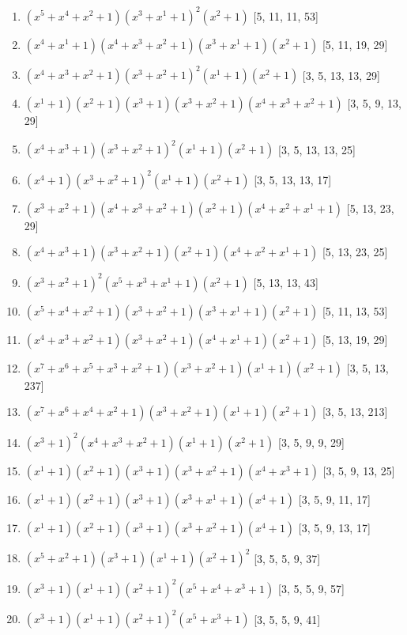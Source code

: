 \documentclass[10pt,twocolumn]{article}
\begin{document}
\begin{enumerate}
\item $(x^{5} + x^{4} + x^{2} + 1)(x^{3} + x^{1} + 1)^{2}(x^{2} + 1)$  [5, 11, 11, 53]
\item $(x^{4} + x^{1} + 1)(x^{4} + x^{3} + x^{2} + 1)(x^{3} + x^{1} + 1)(x^{2} + 1)$  [5, 11, 19, 29]
\item $(x^{4} + x^{3} + x^{2} + 1)(x^{3} + x^{2} + 1)^{2}(x^{1} + 1)(x^{2} + 1)$  [3, 5, 13, 13, 29]
\item $(x^{1} + 1)(x^{2} + 1)(x^{3} + 1)(x^{3} + x^{2} + 1)(x^{4} + x^{3} + x^{2} + 1)$  [3, 5, 9, 13, 29]
\item $(x^{4} + x^{3} + 1)(x^{3} + x^{2} + 1)^{2}(x^{1} + 1)(x^{2} + 1)$  [3, 5, 13, 13, 25]
\item $(x^{4} + 1)(x^{3} + x^{2} + 1)^{2}(x^{1} + 1)(x^{2} + 1)$  [3, 5, 13, 13, 17]
\item $(x^{3} + x^{2} + 1)(x^{4} + x^{3} + x^{2} + 1)(x^{2} + 1)(x^{4} + x^{2} + x^{1} + 1)$  [5, 13, 23, 29]
\item $(x^{4} + x^{3} + 1)(x^{3} + x^{2} + 1)(x^{2} + 1)(x^{4} + x^{2} + x^{1} + 1)$  [5, 13, 23, 25]
\item $(x^{3} + x^{2} + 1)^{2}(x^{5} + x^{3} + x^{1} + 1)(x^{2} + 1)$  [5, 13, 13, 43]
\item $(x^{5} + x^{4} + x^{2} + 1)(x^{3} + x^{2} + 1)(x^{3} + x^{1} + 1)(x^{2} + 1)$  [5, 11, 13, 53]
\item $(x^{4} + x^{3} + x^{2} + 1)(x^{3} + x^{2} + 1)(x^{4} + x^{1} + 1)(x^{2} + 1)$  [5, 13, 19, 29]
\item $(x^{7} + x^{6} + x^{5} + x^{3} + x^{2} + 1)(x^{3} + x^{2} + 1)(x^{1} + 1)(x^{2} + 1)$  [3, 5, 13, 237]
\item $(x^{7} + x^{6} + x^{4} + x^{2} + 1)(x^{3} + x^{2} + 1)(x^{1} + 1)(x^{2} + 1)$  [3, 5, 13, 213]
\item $(x^{3} + 1)^{2}(x^{4} + x^{3} + x^{2} + 1)(x^{1} + 1)(x^{2} + 1)$  [3, 5, 9, 9, 29]
\item $(x^{1} + 1)(x^{2} + 1)(x^{3} + 1)(x^{3} + x^{2} + 1)(x^{4} + x^{3} + 1)$  [3, 5, 9, 13, 25]
\item $(x^{1} + 1)(x^{2} + 1)(x^{3} + 1)(x^{3} + x^{1} + 1)(x^{4} + 1)$  [3, 5, 9, 11, 17]
\item $(x^{1} + 1)(x^{2} + 1)(x^{3} + 1)(x^{3} + x^{2} + 1)(x^{4} + 1)$  [3, 5, 9, 13, 17]
\item $(x^{5} + x^{2} + 1)(x^{3} + 1)(x^{1} + 1)(x^{2} + 1)^{2}$  [3, 5, 5, 9, 37]
\item $(x^{3} + 1)(x^{1} + 1)(x^{2} + 1)^{2}(x^{5} + x^{4} + x^{3} + 1)$  [3, 5, 5, 9, 57]
\item $(x^{3} + 1)(x^{1} + 1)(x^{2} + 1)^{2}(x^{5} + x^{3} + 1)$  [3, 5, 5, 9, 41]

\end{enumerate}
\end{document}
